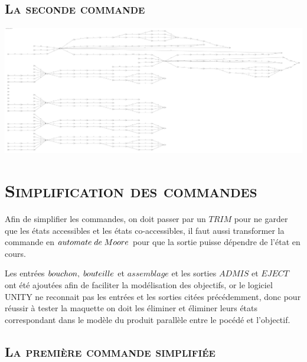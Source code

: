 		  \section{\textsc{La seconde commande}}
			
			\begin{center}
			\includegraphics[scale=0.07]{com2.png}
			\label{fig7}
			\end{center}		  
		  
		   \pagebreak
		 \chapter{\textsc{Simplification des commandes}}
		 
		 \par Afin de simplifier les commandes, on doit passer par un $TRIM$ pour ne garder que les états accessibles et les états co-accessibles, il faut aussi transformer la commande en $automate \hspace{1mm} de \hspace{1mm} Moore$ pour que la sortie puisse dépendre de l'état en cours.\\
		 
		 \par Les entrées $bouchon, \hspace{1mm} bouteille $ et $assemblage$ et les sorties $ADMIS$ et $EJECT$ ont été ajoutées afin de faciliter la modélisation des objectifs, or le logiciel UNITY ne reconnait pas les entrées et les sorties citées précédemment, donc pour réussir à tester la maquette on doit les éliminer et éliminer leurs états correspondant dans le modèle du produit parallèle entre le pocédé et l'objectif.  
		  
		 
		  \section{\textsc{La première commande simplifiée}}
		  
